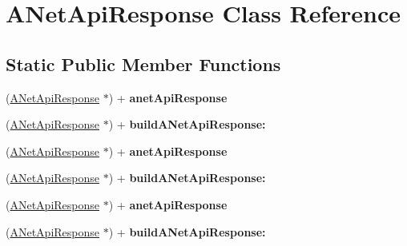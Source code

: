 \hypertarget{interface_a_net_api_response}{
\section{ANetApiResponse Class Reference}
\label{interface_a_net_api_response}
}
\subsection*{Static Public Member Functions}
\begin{DoxyCompactItemize}
\item 
\hypertarget{interface_a_net_api_response_a289131de913b66389646d7780eff2d2c}{
(\hyperlink{interface_a_net_api_response}{ANetApiResponse} $\ast$) + {\bfseries anetApiResponse}}
\label{interface_a_net_api_response_a289131de913b66389646d7780eff2d2c}

\item 
\hypertarget{interface_a_net_api_response_a87fbe712e7adc43789d2de025d51a815}{
(\hyperlink{interface_a_net_api_response}{ANetApiResponse} $\ast$) + {\bfseries buildANetApiResponse:}}
\label{interface_a_net_api_response_a87fbe712e7adc43789d2de025d51a815}

\item 
\hypertarget{interface_a_net_api_response_a289131de913b66389646d7780eff2d2c}{
(\hyperlink{interface_a_net_api_response}{ANetApiResponse} $\ast$) + {\bfseries anetApiResponse}}
\label{interface_a_net_api_response_a289131de913b66389646d7780eff2d2c}

\item 
\hypertarget{interface_a_net_api_response_a87fbe712e7adc43789d2de025d51a815}{
(\hyperlink{interface_a_net_api_response}{ANetApiResponse} $\ast$) + {\bfseries buildANetApiResponse:}}
\label{interface_a_net_api_response_a87fbe712e7adc43789d2de025d51a815}

\item 
\hypertarget{interface_a_net_api_response_a289131de913b66389646d7780eff2d2c}{
(\hyperlink{interface_a_net_api_response}{ANetApiResponse} $\ast$) + {\bfseries anetApiResponse}}
\label{interface_a_net_api_response_a289131de913b66389646d7780eff2d2c}

\item 
\hypertarget{interface_a_net_api_response_a87fbe712e7adc43789d2de025d51a815}{
(\hyperlink{interface_a_net_api_response}{ANetApiResponse} $\ast$) + {\bfseries buildANetApiResponse:}}
\label{interface_a_net_api_response_a87fbe712e7adc43789d2de025d51a815}

\end{DoxyCompactItemize}

